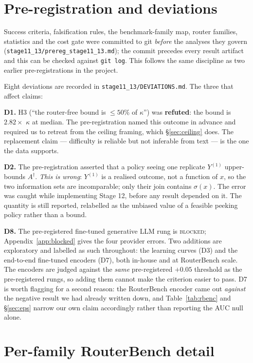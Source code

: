 \section{Pre-registration and deviations}\label{app:prereg}

Success criteria, falsification rules, the benchmark-family map, router families,
statistics and the cost gate were committed to git \emph{before} the analyses
they govern (\texttt{stage11\_13/prereg\_stage11\_13.md}); the commit precedes
every result artifact and this can be checked against \texttt{git log}. This
follows the same discipline as two earlier pre-registrations in the project.

Eight deviations are recorded in \texttt{stage11\_13/DEVIATIONS.md}. The three
that affect claims:

\textbf{D1.} H3 (``the router-free bound is $\le50\%$ of $\kappa$'') was
\textbf{refuted}: the bound is $2.82\times$ $\kappa$ at median. The
pre-registration named this outcome in advance and required us to retreat from
the ceiling framing, which \S\ref{sec:ceiling} does. The replacement claim ---
difficulty is reliable but not inferable from text --- is the one the data
supports.

\textbf{D2.} The pre-registration asserted that a policy seeing one replicate
$Y^{(1)}$ upper-bounds $A^\dagger$. \emph{This is wrong}: $Y^{(1)}$ is a realised
outcome, not a function of $x$, so the two information sets are incomparable; only
their join contains $\sigma(x)$. The error was caught while implementing Stage 12,
before any result depended on it. The quantity is still reported, relabelled as
the unbiased value of a feasible peeking policy rather than a bound.

\textbf{D8.} The pre-registered fine-tuned generative LLM rung is
\textsc{blocked}; Appendix~\ref{app:blocked} gives the four provider errors.
Two additions are exploratory and labelled as such throughout: the learning
curves (D3) and the end-to-end fine-tuned encoders (D7), both in-house and at
RouterBench scale. The encoders are judged against the \emph{same}
pre-registered $+0.05$ threshold as the pre-registered rungs, so adding them
cannot make the criterion easier to pass. D7 is worth flagging for a second
reason: the RouterBench encoder came out \emph{against} the negative result we
had already written down, and Table~\ref{tab:rbenc} and \S\ref{sec:eps} narrow
our own claim accordingly rather than reporting the AUC null alone.

\section{Per-family RouterBench detail}\label{app:rb}

